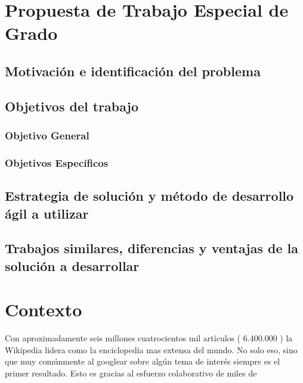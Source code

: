 
\section{Propuesta de Trabajo Especial de Grado}

\subsection{Motivación e identificación del problema}

\subsection{Objetivos del trabajo}

\subsubsection{Objetivo General}
\subsubsection{Objetivos Específicos}

\subsection{Estrategia de solución y método de desarrollo ágil a utilizar}

\subsection{Trabajos similares, diferencias y ventajas de la solución a desarrollar}


\section{Contexto}



Con aproximadamente seis millones cuatrocientos mil artículos ( 6.400.000 ) la Wikipedia lidera como la enciclopedia mas extensa del mundo. No solo eso, sino que muy comúnmente al googlear sobre algún tema de interés siempre es el primer resultado.
Esto es gracias al esfuerzo colaborativo de miles de 




